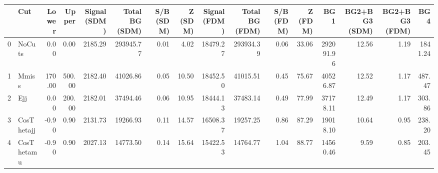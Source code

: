 \begin{tabular}{llrrrrrrrrrrrrrr}
\toprule
{} &         Cut &  Lower &  Upper &  Signal (SDM) &  Total BG (SDM) &  S/B (SDM) &  Z (SDM) &  Signal (FDM) &  Total BG (FDM) &  S/B (FDM) &  Z (FDM) &       BG1 &  BG2+BG3 (SDM) &  BG2+BG3 (FDM) &    BG4  \\
\midrule
0 &      NoCuts &   0.00 &   0.00 &       2185.29 &       293945.77 &       0.01 &     4.02 &      18479.27 &       293934.39 &       0.06 &    33.06 & 292091.96 &          12.56 &           1.19 & 1841.24 \\
1 &       Mmiss & 170.00 & 500.00 &       2182.40 &        41026.86 &       0.05 &    10.50 &      18452.50 &        41015.51 &       0.45 &    75.67 &  40526.87 &          12.52 &           1.17 &  487.47 \\
2 &         Ejj &   0.00 & 200.00 &       2182.01 &        37494.46 &       0.06 &    10.95 &      18444.13 &        37483.14 &       0.49 &    77.99 &  37178.11 &          12.49 &           1.17 &  303.86 \\
3 &  CosThetajj &  -0.90 &   0.90 &       2131.73 &        19266.93 &       0.11 &    14.57 &      16508.37 &        19257.25 &       0.86 &    87.29 &  19018.10 &          10.64 &           0.95 &  238.20 \\
4 &  CosThetamu &  -0.90 &   0.90 &       2027.13 &        14773.50 &       0.14 &    15.64 &      15422.53 &        14764.77 &       1.04 &    88.77 &  14560.46 &           9.59 &           0.85 &  203.45 \\
\bottomrule
\end{tabular}
